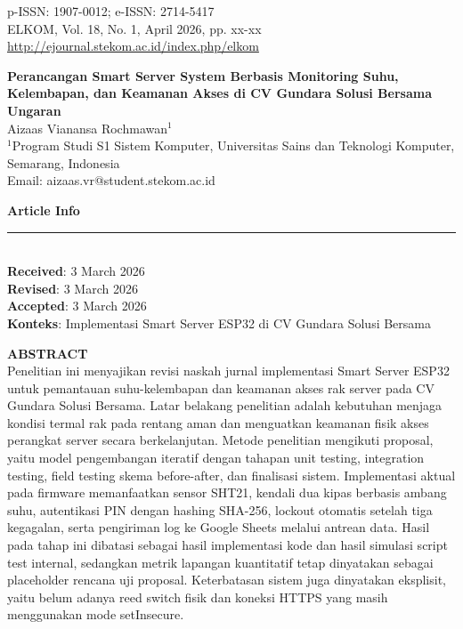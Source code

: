 \documentclass[10pt,a4paper,twocolumn]{article}
\begin{document}
\begin{center}
\footnotesize
p-ISSN: 1907-0012; e-ISSN: 2714-5417 \\
ELKOM, Vol. 18, No. 1, April 2026, pp. xx-xx \\
\url{http://ejournal.stekom.ac.id/index.php/elkom}
\end{center}

\vspace{0.2cm}
\begin{center}
{\Large\bfseries Perancangan Smart Server System Berbasis Monitoring Suhu, Kelembapan, dan Keamanan Akses di CV Gundara Solusi Bersama Ungaran}\\[0.3cm]
Aizaas Vianansa Rochmawan$^1$\\
$^1$Program Studi S1 Sistem Komputer, Universitas Sains dan Teknologi Komputer, Semarang, Indonesia\\
Email: aizaas.vr@student.stekom.ac.id
\end{center}

\vspace{0.2cm}
\noindent
\begin{minipage}[t]{0.30\linewidth}
\textbf{Article Info}\\
\rule{\linewidth}{0.4pt}\\
\textbf{Received}: 3 March 2026\\
\textbf{Revised}: 3 March 2026\\
\textbf{Accepted}: 3 March 2026\\
\textbf{Konteks}: Implementasi Smart Server ESP32 di CV Gundara Solusi Bersama
\end{minipage}
\hfill
\begin{minipage}[t]{0.67\linewidth}
\textbf{ABSTRACT}\\
Penelitian ini menyajikan revisi naskah jurnal implementasi Smart Server ESP32 untuk pemantauan suhu-kelembapan dan keamanan akses rak server pada CV Gundara Solusi Bersama. Latar belakang penelitian adalah kebutuhan menjaga kondisi termal rak pada rentang aman dan menguatkan keamanan fisik akses perangkat server secara berkelanjutan. Metode penelitian mengikuti proposal, yaitu model pengembangan iteratif dengan tahapan unit testing, integration testing, field testing skema before-after, dan finalisasi sistem. Implementasi aktual pada firmware memanfaatkan sensor SHT21, kendali dua kipas berbasis ambang suhu, autentikasi PIN dengan hashing SHA-256, lockout otomatis setelah tiga kegagalan, serta pengiriman log ke Google Sheets melalui antrean data. Hasil pada tahap ini dibatasi sebagai hasil implementasi kode dan hasil simulasi script test internal, sedangkan metrik lapangan kuantitatif tetap dinyatakan sebagai placeholder rencana uji proposal. Keterbatasan sistem juga dinyatakan eksplisit, yaitu belum adanya reed switch fisik dan koneksi HTTPS yang masih menggunakan mode setInsecure.
\end{minipage}
\end{document}
